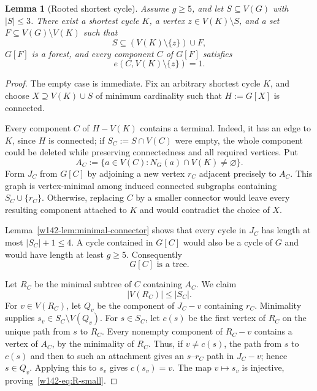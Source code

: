 \documentclass[10pt,a4paper]{amsart}
\newtheorem{lemma}{Lemma}
\begin{document}
\begin{lemma}[Rooted shortest cycle]\label{w142-lem:rooted-cycle}
Assume $g\ge5$, and let $S\subseteq V(G)$ with $|S|\le3$.  There exist a
shortest cycle $K$, a vertex $z\in V(K)\setminus S$, and a set
$F\subseteq V(G)\setminus V(K)$ such that
\[
 S\subseteq (V(K)\setminus\{z\})\cup F,
\]
$G[F]$ is a forest, and every component $C$ of $G[F]$ satisfies
\[
 e(C,V(K)\setminus\{z\})=1.
\]
\end{lemma}

\begin{proof}
The empty case is immediate.  Fix an arbitrary shortest cycle $K$, and
choose $X\supseteq V(K)\cup S$ of minimum cardinality such that
$H:=G[X]$ is connected.

Every component $C$ of $H-V(K)$ contains a terminal.  Indeed, it has an
edge to $K$, since $H$ is connected; if $S_C:=S\cap V(C)$ were empty, the
whole component could be deleted while preserving connectedness and all
required vertices.  Put
\[
 A_C:=\{a\in V(C):N_G(a)\cap V(K)\ne\varnothing\}.
\]
Form $J_C$ from $G[C]$ by adjoining a new vertex $r_C$ adjacent precisely
to $A_C$.  This graph is vertex-minimal among induced connected subgraphs
containing $S_C\cup\{r_C\}$.  Otherwise, replacing $C$ by a smaller
connector would leave every resulting component attached to $K$ and would
contradict the choice of $X$.

Lemma~\ref{w142-lem:minimal-connector} shows that every cycle in $J_C$ has length
at most $|S_C|+1\le4$.  A cycle contained in $G[C]$ would also be a cycle of
$G$ and would have length at least $g\ge5$.  Consequently
\begin{equation}\label{w142-eq:C-tree}
  G[C]\text{ is a tree}.
\end{equation}

Let $R_C$ be the minimal subtree of $C$ containing $A_C$.  We claim
\begin{equation}\label{w142-eq:R-small}
  |V(R_C)|\le |S_C|.
\end{equation}
For $v\in V(R_C)$, let $Q_v$ be the component of $J_C-v$ containing $r_C$.
Minimality supplies $s_v\in S_C\setminus V(Q_v)$.  For $s\in S_C$, let
$c(s)$ be the first vertex of $R_C$ on the unique path from $s$ to $R_C$.
Every nonempty component of $R_C-v$ contains a vertex of $A_C$, by the
minimality of $R_C$.  Thus, if $v\ne c(s)$, the path from $s$ to $c(s)$ and
then to such an attachment gives an $s$--$r_C$ path in $J_C-v$; hence
$s\in Q_v$.  Applying this to $s_v$ gives $c(s_v)=v$.  The map
$v\mapsto s_v$ is injective, proving~\eqref{w142-eq:R-small}.


\end{proof}
\end{document}
